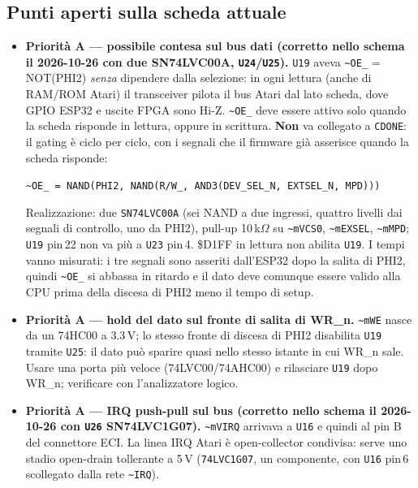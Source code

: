 \documentclass[12pt, a4paper]{article}
\begin{document}
\subsection*{Punti aperti sulla scheda attuale}
\begin{itemize}
  \item \textbf{Priorità A --- possibile contesa sul bus dati (corretto nello schema il 2026-10-26 con due SN74LVC00A, \texttt{U24}/\texttt{U25}).} \texttt{U19} aveva \texttt{\textasciitilde OE\_} = NOT(PHI2) \emph{senza} dipendere dalla selezione: in ogni lettura (anche di RAM/ROM Atari) il transceiver pilota il bus Atari dal lato scheda, dove GPIO ESP32 e uscite FPGA sono Hi-Z. \texttt{\textasciitilde OE\_} deve essere attivo solo quando la scheda risponde in lettura, oppure in scrittura. \textbf{Non} va collegato a \texttt{CDONE}: il gating è ciclo per ciclo, con i segnali che il firmware già asserisce quando la scheda risponde:
  \begin{center}
  \texttt{\textasciitilde OE\_ = NAND(PHI2, NAND(R/W\_, AND3(DEV\_SEL\_N, EXTSEL\_N, MPD)))}
  \end{center}
  Realizzazione: due \texttt{SN74LVC00A} (sei NAND a due ingressi, quattro livelli dai segnali di controllo, uno da PHI2), pull-up 10\,k$\Omega$ su \texttt{\textasciitilde mVCS0}, \texttt{\textasciitilde mEXSEL}, \texttt{\textasciitilde mMPD}; \texttt{U19} pin\,22 non va più a \texttt{U23} pin\,4. \$D1FF in lettura non abilita \texttt{U19}. I tempi vanno misurati: i tre segnali sono asseriti dall'ESP32 dopo la salita di PHI2, quindi \texttt{\textasciitilde OE\_} si abbassa in ritardo e il dato deve comunque essere valido alla CPU prima della discesa di PHI2 meno il tempo di setup.
  \item \textbf{Priorità A --- hold del dato sul fronte di salita di WR\_n.} \texttt{\textasciitilde mWE} nasce da un 74HC00 a 3.3\,V; lo stesso fronte di discesa di PHI2 disabilita \texttt{U19} tramite \texttt{U25}: il dato può sparire quasi nello stesso istante in cui WR\_n sale. Usare una porta più veloce (74LVC00/74AHC00) e rilasciare \texttt{U19} dopo WR\_n; verificare con l'analizzatore logico.
  \item \textbf{Priorità A --- IRQ push-pull sul bus (corretto nello schema il 2026-10-26 con \texttt{U26} SN74LVC1G07).} \texttt{\textasciitilde mVIRQ} arrivava a \texttt{U16} e quindi al pin B del connettore ECI. La linea IRQ Atari è open-collector condivisa: serve uno stadio open-drain tollerante a 5\,V (\texttt{74LVC1G07}, un componente, con \texttt{U16} pin\,6 scollegato dalla rete \texttt{\textasciitilde IRQ}).

\end{itemize}
\end{document}
